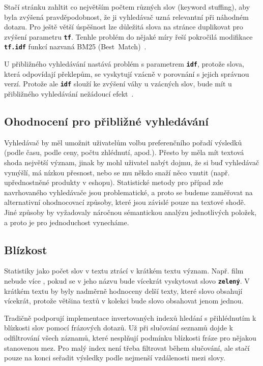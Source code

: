 \documentclass[11pt,letterpaper,oneside,openright]{book}
\newcommand{\bftt}[1]{\texttt{\textbf{#1}}}
\begin{document}
Stačí stránku zahltit co největším počtem různých slov (keyword stuffing), aby
byla zvýšená pravděpodobnost, že ji vyhledávač uzná relevantní při náhodném
dotazu. Pro ještě větší úspěšnost lze důležitá slova na stránce duplikovat pro
zvýšení parametru \bftt{tf}. Tenhle problém do nějaké míry řeší pokročilá
modifikace \bftt{tf.idf} funkcí nazvaná BM25
(Best~Match)~\cite{Robertson:2009:PRF:1704809.1704810}.

U přibližného vyhledávání nastává problém s parametrem \bftt{idf}, protože
slova, která odpovídají překlepům, se vyskytují vzácně v porovnání s jejich
správnou verzí. Protože ale \bftt{idf} slouží ke zvýšení váhy u vzácných slov,
bude mít u přibližného vyhledávání nežádoucí efekt~\cite{elastic_fuzzy}.

\subsection{Ohodnocení pro přibližné vyhledávání}
Vyhledávač by měl umožnit uživatelům volbu preferenčního pořadí výsledků (podle
času, podle ceny, počtu zhlédnutí, apod.). Přesto by měla mít textová shoda
největší význam, jinak by mohl uživatel nabýt dojmu, že si buď vyhledávač
vymýšlí, má nízkou přesnost, nebo se mu někdo snaží něco vnutit (např.
upřednostněné produkty v eshopu). Statistické metody pro případ zde
navrhovaného vyhledávače jsou problematické, a proto se budeme zaměřovat na
alternativní ohodnocovací způsoby, které jsou závislé pouze na textové shodě.
Jiné způsoby by vyžadovaly náročnou sémantickou analýzu jednotlivých položek, a
proto je pro jednoduchost vynecháme.

\subsection{Blízkost}
Statistiky jako počet slov v textu ztrácí v krátkém textu význam. Např. film
nebude více , pokud se v jeho názvu bude vícekrát vyskytovat slovo
\bftt{zelený}. V krátkém textu by byly nadměrně hodnoceny delší texty, které
slovo obsahují vícekrát, protože většina textů v kolekci bude slovo obsahovat
jenom jednou.

Tradičně podporují implementace invertovaných indexů hledání s přihlédnutím k
blízkosti slov pomocí frázových dotazů. Už při slučování seznamů dojde k
odfiltrování všech záznamů, které nesplňují podmínku blízkosti fráze pro
nějakou stanovenou mez. Pro malý index není třeba filtrovat během slučování,
ale stačí pouze na konci seřadit výsledky podle nejmenší vzdálenosti mezi
slovy.
\end{document}
